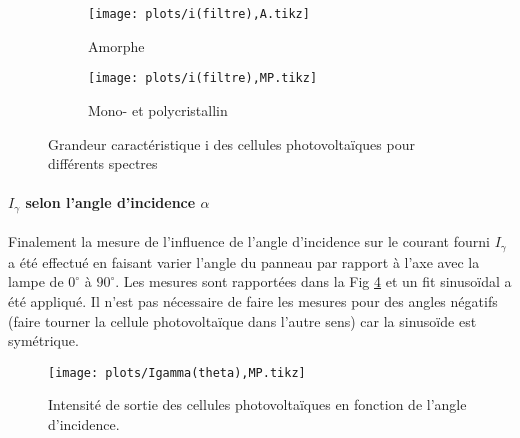 \begin{figure}
    \centering
    \begin{subfigure}[t]{0.45\linewidth}
        \centering
        \texttt{[image: plots/i(filtre),A.tikz]}
        \caption{Amorphe}
        \label{plot:6a}
    \end{subfigure}
    \begin{subfigure}[t]{0.45\linewidth}
        \centering
        \texttt{[image: plots/i(filtre),MP.tikz]}
        \caption{Mono- et polycristallin}
        \label{plot:6b}
    \end{subfigure}
    \caption{Grandeur caractéristique i des cellules photovoltaïques pour différents spectres}
    \label{plot:6}
\end{figure}

\paragraph*{\(I_\gamma\) selon l'angle d'incidence \(\alpha\)}
Finalement la mesure de l'influence de l'angle d'incidence sur le courant fourni \(I_\gamma\) a été effectué en faisant varier l'angle du panneau par rapport à l'axe avec la lampe de \(0^{\circ}\) à \(90^{\circ}\). Les mesures sont rapportées dans la Fig \ref{plot:7} et un fit sinusoïdal a été appliqué. Il n'est pas nécessaire de faire les mesures pour des angles négatifs (faire tourner la cellule photovoltaïque dans l'autre sens) car la sinusoïde est symétrique.

\begin{figure}
    \centering
    \texttt{[image: plots/Igamma(theta),MP.tikz]}
    \caption{Intensité de sortie des cellules photovoltaïques en fonction de l'angle d'incidence.}
    \label{plot:7}
\end{figure}




